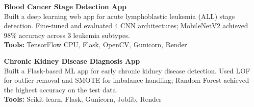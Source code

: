 \begin{cvlistsection}
\item \textbf{Blood Cancer Stage Detection App} \href{https://github.com/2ufiq/Vision-Blood-Cancer-Stage-Detection}{\faGithub}\\
Built a deep learning web app for acute lymphoblastic leukemia (ALL) stage detection. Fine-tuned and evaluated 4 CNN architectures; MobileNetV2 achieved 98\% accuracy across 3 leukemia subtypes.\\
\textbf{Tools:} TensorFlow CPU, Flask, OpenCV, Gunicorn, Render

\item \textbf{Chronic Kidney Disease Diagnosis App} \href{https://github.com/2ufiq/ML-Kidney-Disease-Diagnosis}{\faGithub}\\
Built a Flask-based ML app for early chronic kidney disease detection. Used LOF for outlier removal and SMOTE for imbalance handling; Random Forest achieved the highest accuracy on the test data.\\
\textbf{Tools:} Scikit-learn, Flask, Gunicorn, Joblib, Render

\end{cvlistsection}
